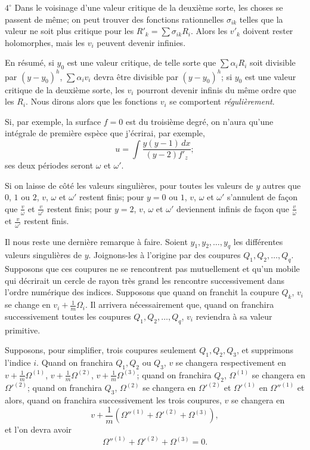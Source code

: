 \documentclass{article}
\begin{document}
$4^\circ$ Dans le voisinage d'une valeur critique de la deuxième sorte, les choses se passent de même; on peut trouver des fonctions rationnelles $\sigma_{ik}$ telles que la valeur ne soit plus critique pour les $\displaystyle R'_{k} = \sum \sigma_{ik} R_{i}$. Alors les $v'_{k}$ doivent rester holomorphes, mais les $v_{i}$ peuvent devenir infinies.

En résumé, si $y_{0}$ est une valeur critique, de telle sorte que $\displaystyle\sum \alpha_{i} R_{i}$ soit divisible par $(y - y_{0})^{h}$, $\displaystyle\sum \alpha_{i} v_{i}$ devra être divisible par $(y - y_{0})^{h}$; si $y_{0}$ est une valeur critique de la deuxième sorte, les $v_{i}$ pourront devenir infinis du même ordre que les $R_{i}$. Nous dirons alors que les fonctions $v_{i}$ se comportent \emph{régulièrement}.

Si, par exemple, la surface $f = 0$ est du troisième degré, on n'aura qu'une intégrale de première espèce que j'écrirai, par exemple,
\[
u = \int \frac{y(y-1)\,dx}{(y-2) f'_{z}};
\]
ses deux périodes seront $\omega$ et $\omega'$.

Si on laisse de côté les valeurs singulières, pour toutes les valeurs de $y$ autres que $0$, $1$ ou $2$, $v$, $\omega$ et $\omega'$ restent finis; pour $y = 0$ ou $1$, $v$, $\omega$ et $\omega'$ s'annulent de façon que $\frac{v}{\omega}$ et $\frac{v}{\omega'}$ restent finis; pour $y = 2$, $v$, $\omega$ et $\omega'$ deviennent infinis de façon que $\frac{v}{\omega}$ et $\frac{v}{\omega'}$ restent finis.

Il nous reste une dernière remarque à faire. Soient $y_{1}, y_{2}, \ldots, y_{q}$ les différentes valeurs singulières de $y$. Joignons-les à l'origine par des coupures $Q_{1}, Q_{2}, \ldots, Q_{q}$. Supposons que ces coupures ne se rencontrent pas mutuellement et qu'un mobile qui décrirait un cercle de rayon très grand les rencontre successivement dans l'ordre numérique des indices. Supposons que quand on franchit la coupure $Q_{k}$, $v_{i}$ se
change en $v_{i} + \frac{1}{m} \Omega_{i}$. Il arrivera nécessairement que, quand on franchira successivement toutes les coupures $Q_{1}, Q_{2}, \ldots, Q_{q}$, $v_{i}$ reviendra à sa valeur primitive.

Supposons, pour simplifier, trois coupures seulement $Q_{1}, Q_{2}, Q_{3}$, et supprimons l'indice $i$. Quand on franchira $Q_{1}, Q_{2}$ ou $Q_{3}$, $v$ se changera respectivement en $v + \frac{1}{m} \Omega^{(1)}$, $v + \frac{1}{m} \Omega^{(2)}$, $v + \frac{1}{m} \Omega^{(3)}$; quand on franchira $Q_{2}$, $\Omega^{(1)}$ se changera en $\Omega'^{(2)}$; quand on franchira $Q_{3}$, $\Omega^{(2)}$ se changera en $\Omega'^{(2)}$ et $\Omega'^{(1)}$ en $\Omega''^{(1)}$ et alors, quand on franchira successivement les trois coupures, $v$ se changera en
\[
v + \frac{1}{m} (\Omega''^{(1)} + \Omega'^{(2)} + \Omega^{(3)}),
\]
et l'on devra avoir
\[
\Omega''^{(1)} + \Omega'^{(2)} + \Omega^{(3)} = 0. \tag{4}
\]
\end{document}
